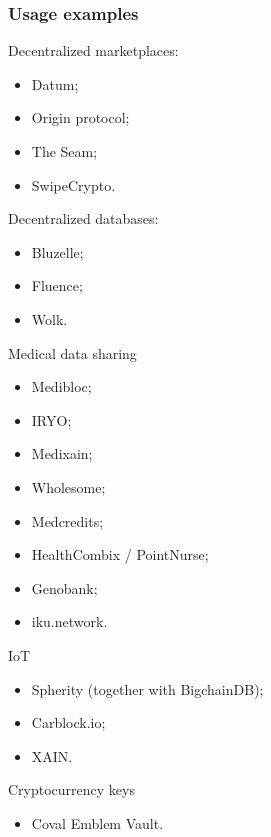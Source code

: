 \documentclass[xetex,mathsans,sans,aspectratio=169]{beamer}
\begin{document}
    \begin{frame}
        \frametitle{Usage examples}
        \begin{multicols}{2}
            Decentralized marketplaces:
            \begin{itemize}
                \item Datum;
                \item Origin protocol;
                \item The Seam;
                \item SwipeCrypto.
            \end{itemize}
            Decentralized databases:
            \begin{itemize}
                \item Bluzelle;
                \item Fluence;
                \item Wolk.
            \end{itemize}
            Medical data sharing
            \begin{itemize}
                \item Medibloc;
                \item IRYO;
                \item Medixain;
                \item Wholesome;
                \item Medcredits;
                \item HealthCombix / PointNurse;
                \item Genobank;
                \item iku.network.
            \end{itemize}
            IoT
            \begin{itemize}
                \item Spherity (together with BigchainDB);
                \item Carblock.io;
                \item XAIN.
            \end{itemize}
            Cryptocurrency keys
            \begin{itemize}
                \item Coval Emblem Vault.
            \end{itemize}
        \end{multicols}
    \end{frame}
\end{document}
